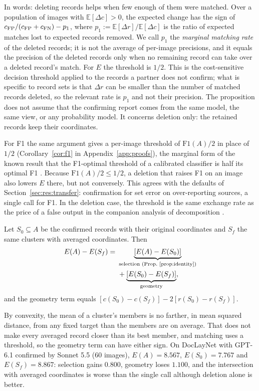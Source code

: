 In words: deleting records helps when few enough of them were matched. Over a population of images with $\mathbb{E}[\Delta c]>0$, the expected change has the sign of $c_{\mathrm{FP}}/(c_{\mathrm{FP}}+c_{\mathrm{FN}})-p_1$, where $p_1:=\mathbb{E}[\Delta r]/\mathbb{E}[\Delta c]$ is the ratio of expected matches lost to expected records removed. We call $p_1$ the \emph{marginal matching rate} of the deleted records; it is not the average of per-image precisions, and it equals the precision of the deleted records only when no remaining record can take over a deleted record's match. For $E$ the threshold is $1/2$. This is the cost-sensitive decision threshold \citep{elkan2001costsensitive} applied to the records a partner does not confirm; what is specific to record sets is that $\Delta r$ can be smaller than the number of matched records deleted, so the relevant rate is $p_1$ and not their precision. The proposition does not assume that the confirming report comes from the same model, the same view, or any probability model. It concerns deletion only: the retained records keep their coordinates.

For F1 the same argument gives a per-image threshold of $\mathrm{F1}(A)/2$ in place of $1/2$ (Corollary~\ref{cor:f1} in Appendix~\ref{app:proofs}), the marginal form of the known result that the F1-optimal threshold of a calibrated classifier is half its optimal F1 \citep{lipton2014f1}. Because $\mathrm{F1}(A)/2\le1/2$, a deletion that raises F1 on an image also lowers $E$ there, but not conversely. This agrees with the defaults of Section~\ref{sec:res:transfer}: confirmation for set error on over-reporting sources, a single call for F1. In the deletion case, the threshold is the same exchange rate as the price of a false output in the companion analysis of decomposition \citep{shi2026zoomin}.

\begin{proposition}\label{prop:geometry}
Let $S_0\subseteq A$ be the confirmed records with their original coordinates and $S_f$ the same clusters with averaged coordinates. Then
\begin{align*}
E(A)-E(S_f)=\ &\underbrace{[E(A)-E(S_0)]}_{\text{selection (Prop.~\ref{prop:identity})}}\\
&+\underbrace{[E(S_0)-E(S_f)]}_{\text{geometry}},
\end{align*}
and the geometry term equals $[c(S_0)-c(S_f)]-2[r(S_0)-r(S_f)]$.
\end{proposition}
By convexity, the mean of a cluster's members is no farther, in mean squared distance, from any fixed target than the members are on average. That does not make every averaged record closer than its best member, and matching uses a threshold, so the geometry term can have either sign. On DocLayNet with GPT-6.1 confirmed by Sonnet 5.5 (60 images), $E(A)=8.567$, $E(S_0)=7.767$ and $E(S_f)=8.867$: selection gains $0.800$, geometry loses $1.100$, and the intersection with averaged coordinates is worse than the single call although deletion alone is better.

